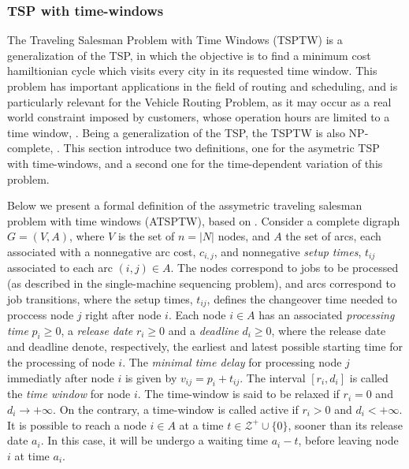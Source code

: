 \subsubsection{TSP with time-windows}
\label{sec:time-windows-tsp}

The Traveling Salesman Problem with Time Windows (TSPTW) is a generalization of the TSP,
in which the objective is to find a minimum cost hamiltionian cycle which visits
every city in its requested time window. This problem has important applications
in the field of routing and scheduling, and is particularly relevant for the Vehicle Routing Problem,
as it may occur as a real world constraint imposed by customers, whose operation hours 
are limited to a time window, \cite{vrptw_exact}. Being a generalization of the TSP, the TSPTW is also NP-complete, \cite{tsptw_exact}.
This section introduce two definitions, one for the asymetric TSP with time-windows,
and a second one for the time-dependent variation of this problem.

Below we present a formal definition of the assymetric traveling salesman problem with time windows (ATSPTW),
based on \cite{tsptw_polyhedra}.
Consider a complete digraph $G = (V, A)$, where $V$ is the set of $n = |N|$ nodes,
and $A$ the set of arcs, each associated with a nonnegative arc cost, $c_{i,j}$,
and nonnegative \textit{setup times}, $t_{ij}$ associated to each arc $(i, j) \in A$.
The nodes correspond to jobs to be processed (as described in the single-machine sequencing problem),
and arcs correspond to job transitions, where the setup times, $t_{ij}$, defines
the changeover time needed to proccess node $j$ right after node $i$.
Each node $i \in A$ has an associated \textit{processing time} $p_{i} \geq 0$,
a \textit{release date} $r_{i} \geq 0$ and a \textit{deadline} $d_{i} \geq 0$,
where the release date and deadline denote, respectively, the earliest and latest possible starting 
time for the processing of node $i$. 
The \textit{minimal time delay} for processing node $j$ immediatly after node $i$ is given by $v_{ij} = p_{i} + t_{ij}$.
The interval $[r_{i}, d_{i}]$ is called the \textit{time window} for node $i$.
The time-window is said to be relaxed if $r_{i} = 0$ and $ d_{i} \rightarrow +\infty$.
On the contrary, a time-window is called active if $r_{i} > 0$ and $ d_{i} < +\infty$.
It is possible to reach a node $i \in A$ at a time $t \in \mathcal{Z}^+ \cup \{0\}$, sooner than its release date $a_{i}$.
In this case, it will be undergo a waiting time $a_i-t$, before leaving node $i$ at time $a_{i}$.

